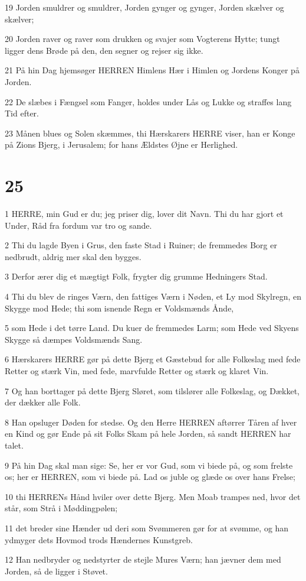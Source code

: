 \par 19 Jorden smuldrer og smuldrer, Jorden gynger og gynger, Jorden skælver og skælver;
\par 20 Jorden raver og raver som drukken og svajer som Vogterens Hytte; tungt ligger dens Brøde på den, den segner og rejser sig ikke.
\par 21 På hin Dag hjemsøger HERREN Himlens Hær i Himlen og Jordens Konger på Jorden.
\par 22 De slæbes i Fængsel som Fanger, holdes under Lås og Lukke og straffes lang Tid efter.
\par 23 Månen blues og Solen skæmmes, thi Hærskarers HERRE viser, han er Konge på Zions Bjerg, i Jerusalem; for hans Ældstes Øjne er Herlighed.

\chapter{25}

\par 1 HERRE, min Gud er du; jeg priser dig, lover dit Navn. Thi du har gjort et Under, Råd fra fordum var tro og sande.
\par 2 Thi du lagde Byen i Grus, den faste Stad i Ruiner; de fremmedes Borg er nedbrudt, aldrig mer skal den bygges.
\par 3 Derfor ærer dig et mægtigt Folk, frygter dig grumme Hedningers Stad.
\par 4 Thi du blev de ringes Værn, den fattiges Værn i Nøden, et Ly mod Skylregn, en Skygge mod Hede; thi som isnende Regn er Voldsmænds Ånde,
\par 5 som Hede i det tørre Land. Du kuer de fremmedes Larm; som Hede ved Skyens Skygge så dæmpes Voldsmænds Sang.
\par 6 Hærskarers HERRE gør på dette Bjerg et Gæstebud for alle Folkeslag med fede Retter og stærk Vin, med fede, marvfulde Retter og stærk og klaret Vin.
\par 7 Og han borttager på dette Bjerg Sløret, som tilslører alle Folkeslag, og Dækket, der dækker alle Folk.
\par 8 Han opsluger Døden for stedse. Og den Herre HERREN aftørrer Tåren af hver en Kind og gør Ende på sit Folks Skam på hele Jorden, så sandt HERREN har talet.
\par 9 På hin Dag skal man sige: Se, her er vor Gud, som vi biede på, og som frelste os; her er HERREN, som vi biede på. Lad os juble og glæde os over hans Frelse;
\par 10 thi HERRENs Hånd hviler over dette Bjerg. Men Moab trampes ned, hvor det står, som Strå i Møddingpølen;
\par 11 det breder sine Hænder ud deri som Svømmeren gør for at svømme, og han ydmyger dets Hovmod trods Hændernes Kunstgreb.
\par 12 Han nedbryder og nedstyrter de stejle Mures Værn; han jævner dem med Jorden, så de ligger i Støvet.

